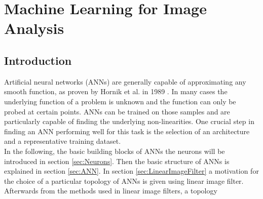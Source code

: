 
\chapter{Machine Learning for Image Analysis} %

\label{CNN} %

\section{Introduction}

Artificial neural networks (ANNs) are generally capable of approximating any smooth function, as proven by Hornik et al. in 1989 \cite{Hornik1989}. In many cases the underlying function of a problem is unknown and the function can only be probed at certain points. ANNs can be trained on those samples and are particularly capable of finding the underlying non-linearities. One crucial step in finding an ANN performing well for this task is the selection of an architecture and a representative training dataset. \\

In the following, the basic building blocks of ANNs the neurons will be introduced in section \ref{sec:Neurons}. Then the basic structure of ANNs is explained in section \ref{sec:ANN}. In section \ref{sec:LinearImageFilter} a motivation for the choice of a particular topology of ANNs is given using linear image filter. Afterwards from the methods used in linear image filters, a topology 



